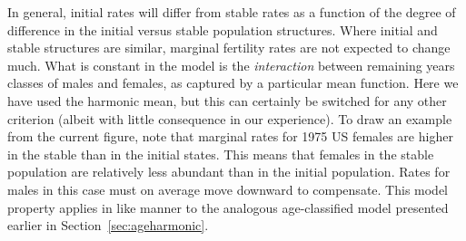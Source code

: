 In general, initial rates will differ from stable rates as a function of the
degree of difference in the initial versus stable population structures. Where
initial and stable structures are similar, marginal fertility rates are not
expected to change much. What is constant in the model is the
\textit{interaction} between remaining years classes of males and females, as
captured by a particular mean function. Here we have used the harmonic mean, but
this can certainly be switched for any other criterion (albeit with little
consequence in our experience). To draw an example from the current figure, note
that marginal rates for 1975 US females are higher in the stable than in the
initial states. This means that females in the stable population are relatively
less abundant than in the initial population. Rates for males in this case must
on average move downward to compensate. This model property applies in like manner to the analogous age-classified model
presented earlier in Section~\ref{sec:ageharmonic}.

\FloatBarrier